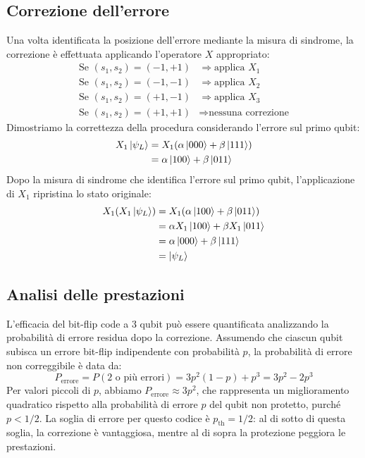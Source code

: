 \documentclass[a4paper,12pt]{report}
\theoremstyle{plain}
\begin{document}
\subsection{Correzione dell'errore}
Una volta identificata la posizione dell'errore mediante la misura di sindrome, la correzione è effettuata applicando l'operatore $X$ appropriato:
\begin{align}
\text{Se } (s_1, s_2) = (-1, +1) &\Rightarrow \text{applica } X_1 \\
\text{Se } (s_1, s_2) = (-1, -1) &\Rightarrow \text{applica } X_2 \\
\text{Se } (s_1, s_2) = (+1, -1) &\Rightarrow \text{applica } X_3 \\
\text{Se } (s_1, s_2) = (+1, +1) &\Rightarrow \text{nessuna correzione}
\end{align}
Dimostriamo la correttezza della procedura considerando l'errore sul primo qubit:
\begin{align}
X_1\ket{\psi_L} &= X_1(\alpha\ket{000} + \beta\ket{111}) \\
&= \alpha\ket{100} + \beta\ket{011}
\end{align}
Dopo la misura di sindrome che identifica l'errore sul primo qubit, l'applicazione di $X_1$ ripristina lo stato originale:
\begin{align}
X_1(X_1\ket{\psi_L}) &= X_1(\alpha\ket{100} + \beta\ket{011}) \\
&= \alpha X_1\ket{100} + \beta X_1\ket{011} \\
&= \alpha\ket{000} + \beta\ket{111} \\
&= \ket{\psi_L}
\end{align}
\subsection{Analisi delle prestazioni}
L'efficacia del bit-flip code a 3 qubit può essere quantificata analizzando la probabilità di errore residua dopo la correzione. Assumendo che ciascun qubit subisca un errore bit-flip indipendente con probabilità $p$, la probabilità di errore non correggibile è data da:
\[
P_{\text{errore}} = P(\text{2 o più errori}) = 3p^2(1-p) + p^3 = 3p^2 - 2p^3
\]
Per valori piccoli di $p$, abbiamo $P_{\text{errore}} \approx 3p^2$, che rappresenta un miglioramento quadratico rispetto alla probabilità di errore $p$ del qubit non protetto, purché $p < 1/2$.
La soglia di errore per questo codice è $p_{\text{th}} = 1/2$: al di sotto di questa soglia, la correzione è vantaggiosa, mentre al di sopra la protezione peggiora le prestazioni.
\end{document}
